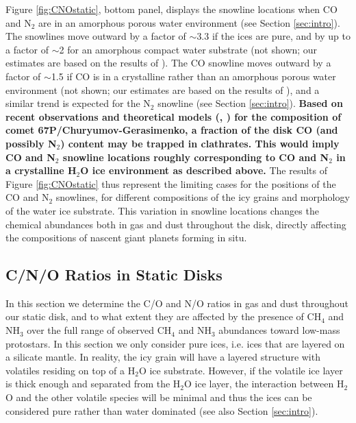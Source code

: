 \documentclass[apj]{emulateapj}
\begin{document}
Figure \ref{fig:CNOstatic}, bottom panel, displays the snowline locations when CO and N$_2$ are in an amorphous porous water environment (see Section \ref{sec:intro}).  The snowlines move outward by a factor of $\sim$3.3 if the ices are pure, and by up to a factor of $\sim$2 for an amorphous compact water substrate (not shown; our estimates are based on the results of \citealt{fayolle16}). The CO snowline moves outward by a factor of $\sim$1.5 if CO is in a crystalline rather than an amorphous porous water environment (not shown; our estimates are based on the results of \citealt{noble12}), and a similar trend is expected for the N$_2$ snowline (see Section \ref{sec:intro}). 
\textbf{Based on recent observations \citep{luspay16} and theoretical models (\citealt{lectez15}, \citealt{mousis16}) for the composition of comet 67P/Churyumov-Gerasimenko, a fraction of the disk CO (and possibly N$_2$) content may be trapped in clathrates. This would imply CO and N$_2$ snowline locations roughly corresponding to  CO and N$_2$ in a crystalline H$_2$O ice environment as described above.} 
The results of Figure \ref{fig:CNOstatic} thus represent the limiting cases for the positions of the CO and N$_2$ snowlines, for different compositions of the icy grains and morphology of the water ice substrate. This variation in snowline locations changes the chemical abundances both in gas and dust throughout the disk, directly affecting the compositions of nascent giant planets forming in situ. %


\subsection{C/N/O Ratios in Static Disks}
\label{sec:static}

In this section we determine the C/O and N/O ratios in gas and dust throughout our static disk, and to what extent they are affected by the presence of CH$_4$ and NH$_3$ over the full range of observed CH$_4$ and NH$_3$ abundances toward low-mass protostars. In this section we only consider pure ices, i.e. ices that are layered on a silicate mantle. In reality, the icy grain will have a layered structure with volatiles residing on top of a H$_2$O ice substrate. However, if the volatile ice layer is thick enough and separated from the H$_2$O ice layer, the interaction between H$_2$O and the other volatile species will be minimal and thus the ices can be considered pure rather than water dominated (see also Section \ref{sec:intro}).
\end{document}
